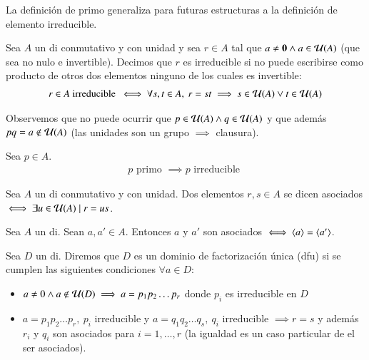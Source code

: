 La definición de primo generaliza para futuras estructuras a la definición de elemento irreducible.

\begin{dfn}
	Sea $A$ un \gls{di} conmutativo y con unidad y sea $r \in A$ tal que $a \neq \mathbf{0} \land a \in \mathcal{U}(A)$ (que sea no nulo e invertible). Decimos que $r$ es irreducible si no puede escribirse como producto de otros dos elementos ninguno de los cuales es invertible:
	\begin{align}
		r \in A \text{ irreducible } \iff \forall s,t \in A,\ r = st \implies s \in \mathcal{U}(A) \lor t \in \mathcal{U}(A)
	\end{align}
\end{dfn}

Observemos que no puede ocurrir que $p \in \mathcal{U}(A) \land q \in \mathcal{U}(A)$ y que además $pq = a \notin \mathcal{U}(A)$ (las unidades son un grupo $\implies$ clausura).


\begin{pro}
	Sea $p \in A$.
	\begin{align*}
		p \text{ primo } \implies p \text{ irreducible }
	\end{align*}
\end{pro}

\begin{dfn}
	Sea $A$ un \gls{di} conmutativo y con unidad. Dos elementos $r,s \in A$ se dicen asociados $\iff \exists u \in \mathcal{U}(A) \mid r = us$.
\end{dfn}

\begin{pro}
	Sea $A$ un \gls{di}. Sean $a,a' \in A$. Entonces $a$ y $a'$ son asociados $\iff \langle a\rangle = \langle a'\rangle$.
\end{pro}

\begin{dfn}
	\label{dfn:dfu}
	Sea $D$ un \gls{di}. Diremos que $D$ es un dominio de factorización única (\gls{dfu}) si se cumplen las siguientes condiciones $\forall a \in D$:
	\begin{itemize}
		\item $a \neq 0 \land a \not\in\mathcal{U}(D) \implies a = p_1p_2\dots p_r$ donde $p_i$ es irreducible en $D$
		\item $a = p_1p_2\dots p_r,\ p_i$ irreducible y $a = q_1q_2 \dots q_s,\ q_i$ irreducible $\implies r = s$ y además $r_i$ y $q_i$ son asociados para $i = 1, \dots, r$ (la igualdad es un caso particular de el ser asociados).
	\end{itemize}
\end{dfn}

